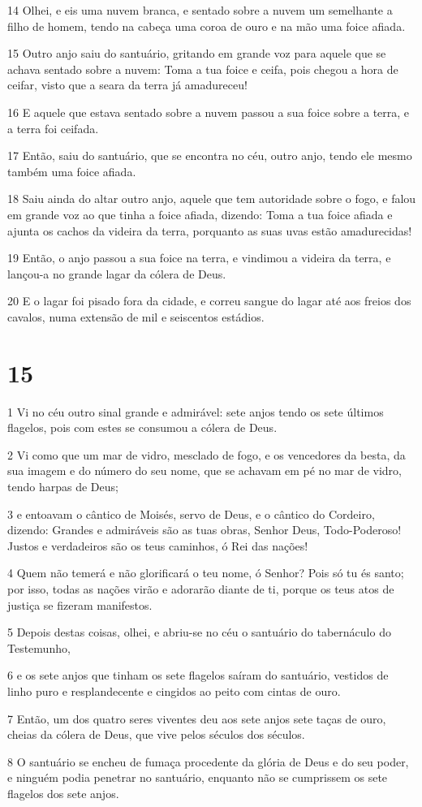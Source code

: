 \par 14 Olhei, e eis uma nuvem branca, e sentado sobre a nuvem um semelhante a filho de homem, tendo na cabeça uma coroa de ouro e na mão uma foice afiada.
\par 15 Outro anjo saiu do santuário, gritando em grande voz para aquele que se achava sentado sobre a nuvem: Toma a tua foice e ceifa, pois chegou a hora de ceifar, visto que a seara da terra já amadureceu!
\par 16 E aquele que estava sentado sobre a nuvem passou a sua foice sobre a terra, e a terra foi ceifada.
\par 17 Então, saiu do santuário, que se encontra no céu, outro anjo, tendo ele mesmo também uma foice afiada.
\par 18 Saiu ainda do altar outro anjo, aquele que tem autoridade sobre o fogo, e falou em grande voz ao que tinha a foice afiada, dizendo: Toma a tua foice afiada e ajunta os cachos da videira da terra, porquanto as suas uvas estão amadurecidas!
\par 19 Então, o anjo passou a sua foice na terra, e vindimou a videira da terra, e lançou-a no grande lagar da cólera de Deus.
\par 20 E o lagar foi pisado fora da cidade, e correu sangue do lagar até aos freios dos cavalos, numa extensão de mil e seiscentos estádios.

\chapter{15}

\par 1 Vi no céu outro sinal grande e admirável: sete anjos tendo os sete últimos flagelos, pois com estes se consumou a cólera de Deus.
\par 2 Vi como que um mar de vidro, mesclado de fogo, e os vencedores da besta, da sua imagem e do número do seu nome, que se achavam em pé no mar de vidro, tendo harpas de Deus;
\par 3 e entoavam o cântico de Moisés, servo de Deus, e o cântico do Cordeiro, dizendo: Grandes e admiráveis são as tuas obras, Senhor Deus, Todo-Poderoso! Justos e verdadeiros são os teus caminhos, ó Rei das nações!
\par 4 Quem não temerá e não glorificará o teu nome, ó Senhor? Pois só tu és santo; por isso, todas as nações virão e adorarão diante de ti, porque os teus atos de justiça se fizeram manifestos.
\par 5 Depois destas coisas, olhei, e abriu-se no céu o santuário do tabernáculo do Testemunho,
\par 6 e os sete anjos que tinham os sete flagelos saíram do santuário, vestidos de linho puro e resplandecente e cingidos ao peito com cintas de ouro.
\par 7 Então, um dos quatro seres viventes deu aos sete anjos sete taças de ouro, cheias da cólera de Deus, que vive pelos séculos dos séculos.
\par 8 O santuário se encheu de fumaça procedente da glória de Deus e do seu poder, e ninguém podia penetrar no santuário, enquanto não se cumprissem os sete flagelos dos sete anjos.

